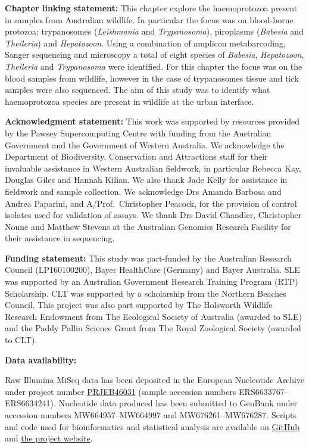 \documentclass[a4paper, nobind]{templates/ociamthesis}
\begin{document}
\textbf{Chapter linking statement:}
This chapter explore the haemoprotozoa present in samples from Australian wildlife. In particular the focus was on blood-borne protozoa; trypanosomes (\emph{Leishmania} and \emph{Trypanosoma}), piroplasms (\emph{Babesia} and \emph{Theileria}) and \emph{Hepatozoon}. Using a combination of amplicon metabarcoding, Sanger sequencing and microscopy a total of eight species of \emph{Babesia}, \emph{Hepatozoon}, \emph{Theileria} and \emph{Trypanosoma} were identified. For this chapter the focus was on the blood samples from wildlife, however in the case of trypanosomes tissue and tick samples were also sequenced. The aim of this study was to identify what haemoprotozoa species are present in wildlife at the urban interface.

\vspace{5mm}

\textbf{Acknowledgment statement:} This work was supported by resources provided by the Pawsey Supercomputing Centre with funding from the Australian Government and the Government of Western Australia.
We acknowledge the Department of Biodiversity, Conservation and Attractions staff for their invaluable assistance in Western Australian fieldwork, in particular Rebecca Kay, Douglas Giles and Hannah Kilian.
We also thank Jade Kelly for assistance in fieldwork and sample collection.
We acknowledge Drs Amanda Barbosa and Andrea Paparini, and A/Prof.~Christopher Peacock, for the provision of control isolates used for validation of assays.
We thank Drs David Chandler, Christopher Noune and Matthew Stevens at the Australian Genomics Research Facility for their assistance in sequencing.

\vspace{5mm}

\textbf{Funding statement:} This study was part-funded by the Australian Research Council (LP160100200), Bayer HealthCare (Germany) and Bayer Australia. SLE was supported by an Australian Government Research Training Program (RTP) Scholarship. CLT was supported by a scholarship from the Northern Beaches Council. This project was also part supported by The Holsworth Wildlife Research Endowment from The Ecological Society of Australia (awarded to SLE) and the Paddy Pallin Science Grant from The Royal Zoological Society (awarded to CLT).

\vspace{5mm}

\textbf{Data availability:}

Raw Illumina MiSeq data has been deposited in the European Nucleotide Archive under project number \href{https://www.ebi.ac.uk/ena/browser/view/PRJEB46031}{PRJEB46031} (sample accession numbers ERS6633767--ERS6634241). Nucleotide data produced has been submitted to GenBank under accession numbers MW664957--MW664997 and MW676261--MW676287. Scripts and code used for bioinformatics and statistical analysis are available on \href{https://github.com/siobhon-egan/wildlife-haemoprotozoa}{GitHub} and \href{https://siobhonlegan.com/wildlife-haemoprotozoa}{the project website}.
\end{document}
